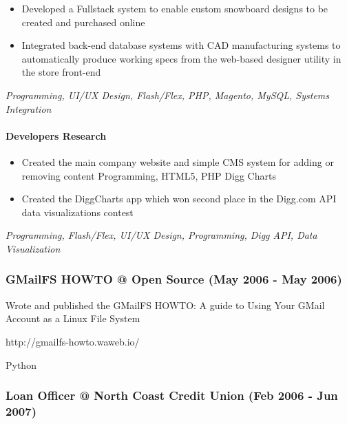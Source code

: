 \begin{itemize}
\tightlist
\item
  Developed a Fullstack system to enable custom snowboard designs to be
  created and purchased online
\item
  Integrated back-end database systems with CAD manufacturing systems to
  automatically produce working specs from the web-based designer
  utility in the store front-end
\end{itemize}

\emph{Programming, UI/UX Design, Flash/Flex, PHP, Magento, MySQL,
Systems Integration}

\hypertarget{developers-research}{%
\paragraph{Developers Research}\label{developers-research}}

\begin{itemize}
\tightlist
\item
  Created the main company website and simple CMS system for adding or
  removing content Programming, HTML5, PHP Digg Charts
\item
  Created the DiggCharts app which won second place in the Digg.com API
  data visualizations contest
\end{itemize}

\emph{Programming, Flash/Flex, UI/UX Design, Programming, Digg API, Data
Visualization}

\hypertarget{gmailfs-howto-open-source-may-2006---may-2006}{%
\subsubsection{GMailFS HOWTO @ Open Source (May 2006 - May
2006)}\label{gmailfs-howto-open-source-may-2006---may-2006}}

Wrote and published the GMailFS HOWTO: A guide to Using Your GMail
Account as a Linux File System

http://gmailfs-howto.waweb.io/

Python

\hypertarget{loan-officer-north-coast-credit-union-feb-2006---jun-2007}{%
\subsubsection{Loan Officer @ North Coast Credit Union (Feb 2006 - Jun
2007)}\label{loan-officer-north-coast-credit-union-feb-2006---jun-2007}}

